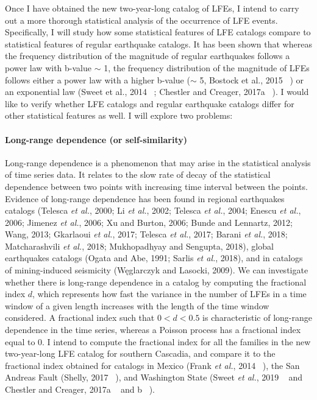 \documentclass[letterpaper, 12pt]{article}
\begin{document}
Once I have obtained the new two-year-long catalog of LFEs, I intend to carry out a more thorough statistical analysis of the occurrence of LFE events. Specifically, I will study how some statistical features of LFE catalogs compare to statistical features of regular earthquake catalogs. It has been shown that whereas the frequency distribution of the magnitude of regular earthquakes follows a power law with b-value $\sim$ 1, the frequency distribution of the magnitude of LFEs follows either a power law with a higher b-value ($\sim$ 5, Bostock et al., 2015 ~\cite{BOS_2015}) or an exponential law (Sweet et al., 2014 ~\cite{SWE_2014}; Chestler and Creager, 2017a ~\cite{CHE_2017_JGR}). I would like to verify whether LFE catalogs and regular earthquake catalogs differ for other statistical features as well. I will explore two problems:

\paragraph{Long-range dependence (or self-similarity)} Long-range dependence is a phenomenon that may arise in the statistical analysis of time series data. It relates to the slow rate of decay of the statistical dependence between two points with increasing time interval between the points. Evidence of long-range dependence has been found in regional earthquakes catalogs (Telesca \textit{et al.}, 2000; Li \textit{et al.}, 2002; Telesca \textit{et al.}, 2004; Enescu \textit{et al.}, 2006; Jimenez \textit{et al.}, 2006; Xu and Burton, 2006; Bunde and Lennartz, 2012; Wang, 2013; Gkarlaoui \textit{et al.}, 2017; Telesca \textit{et al.}, 2017; Barani \textit{et al.}, 2018; Matcharashvili \textit{et al.}, 2018; Mukhopadhyay and Sengupta, 2018), global earthquakes catalogs (Ogata and Abe, 1991; Sarlis \textit{et al.}, 2018), and in catalogs of mining-induced seismicity (W\k{e}glarczyk and Lasocki, 2009). We can investigate whether there is long-range dependence in a catalog by computing the fractional index $d$, which represents how fast the variance in the number of LFEs in a time window of a given length increases with the length of the time window considered. A fractional index such that $0 < d < 0.5$ is characteristic of long-range dependence in the time series, whereas a Poisson process has a fractional index equal to 0. I intend to compute the fractional index for all the families in the new two-year-long LFE catalog for southern Cascadia, and compare it to the fractional index obtained for catalogs in Mexico (Frank \textit{et al.}, 2014 ~\cite{FRA_2014}), the San Andreas Fault (Shelly, 2017 ~\cite{SHE_2017}), and Washington State (Sweet \textit{et al.}, 2019 ~\cite{SWE_2019} and Chestler and Creager, 2017a ~\cite{CHE_2017_JGR} and b ~\cite{CHE_2017_G3}). \\
\end{document}
